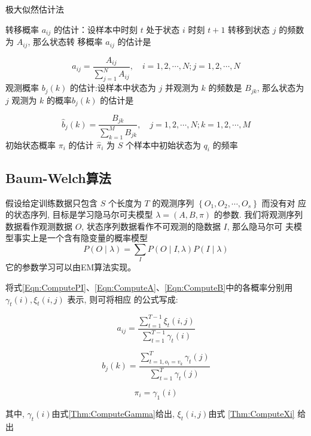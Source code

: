 \begin{algorithm}[htbp]
    \caption{极大似然估计法}
    

    转移概率 $ a_{i j} $ 的估计：设样本中时刻 $ t $ 处于状态 $ i $ 时刻 $ t+1 $ 转移到状态 $ j $ 的频数为 $ A_{i j} $, 那么状态转 移概率 $ a_{i j} $ 的估计是
    
    $$ \hat{a}_{i j}=\frac{A_{i j}}{\sum_{j=1}^{N} A_{i j}}, \quad i=1,2, \cdots, N ; j=1,2, \cdots, N $$
    \;
    观测概率 $ b_{j}(k) $ 的估计:设样本中状态为 $ j $ 并观测为 $ k $ 的频数是 $ B_{j k} $, 那么状态为 $ j $ 观测为 $ k $ 的概率$ b_{j}(k) $ 的估计是

    $$
    \hat{b}_{j}(k)=\frac{B_{j k}}{\sum_{k=1}^{M} B_{j k}}, \quad j=1,2, \cdots, N ; k=1,2, \cdots, M
    $$\;
    初始状态概率 $ \pi_{i} $ 的估计 $ \hat{\pi}_{i} $ 为 $ S $ 个样本中初始状态为 $ q_{i} $ 的频率\;

\end{algorithm}

\subsection{Baum-Welch算法}

假设给定训练数据只包含 $ S $ 个长度为 $ T $ 的观测序列 $ \left\{O_{1}, O_{2}, \cdots, O_{s}\right\} $ 而没有对 应的状态序列, 目标是学习隐马尔可夫模型 $ \lambda=(A, B, \pi) $ 的参数. 我们将观测序列数据看作观测数据 $ O $, 状态序列数据看作不可观测的隐数据 $ I $, 那么隐马尔可 夫模型事实上是一个含有隐变量的概率模型
$$
P(O \mid \lambda)=\sum_{I} P(O \mid I, \lambda) P(I \mid \lambda)
$$
它的参数学习可以由EM算法实现。

\begin{theorem}
    将式\ref{Eqn:ComputePI}、\ref{Eqn:ComputeA}、\ref{Eqn:ComputeB}中的各概率分别用 $ \gamma_{t}(i), \xi_{t}(i, j) $ 表示, 则可将相应 的公式写成:

    $$ a_{i j}=\frac{\sum_{t=1}^{T-1} \xi_{t}(i, j)}{\sum_{t=1}^{T-1} \gamma_{t}(i)} $$

    $$ b_{j}(k)=\frac{\sum_{t=1, o_{t}=v_{k}}^{T} \gamma_{t}(j)}{\sum_{t=1}^{T} \gamma_{t}(j)} $$

    $$ \pi_{i}=\gamma_{1}(i) $$

    其中, $ \gamma_{t}(i)$由式\ref{Thm:ComputeGamma}给出, $\xi_{t}(i, j) $由式 \ref{Thm:ComputeXi} 给出
\end{theorem}



